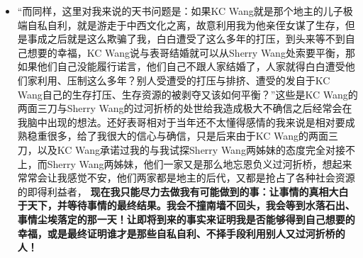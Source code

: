 \documentclass[9pt, b5paper]{article}
\begin{document}
\begin{itemize}
\begin{itemize}
\begin{itemize}
\item “而同样，这里对我来说的天书问题是：如果KC Wang就是那个地主的儿子极端自私自利，就是游走于中西文化之离，故意利用我为他亲侄女谋了生存，但是事成之后就是这么欺骗了我，白白遭受了这么多年的打压，到头来等不到自己想要的幸福，KC Wang说与表哥结婚就可以从Sherry Wang处索要平衡，那如果他们自己没能履行诺言，他们自己不跟人家结婚了，人家就得白白遭受他们家利用、压制这么多年？别人受遭受的打压与排挤、遭受的发自于KC Wang自己的生存打压、生存资源的被剥夺又该如何平衡？”这些是KC Wang的两面三刀与Sherry Wang的过河折桥的处世给我造成极大不确信之后经常会在我脑中出现的想法。还好表哥相对于当年还不太懂得感情的我来说是相对要成熟稳重很多，给了我很大的信心与确信，只是后来由于KC Wang的两面三刀，以及KC Wang承诺过我的与我试探Sherry Wang两姊妹的态度完全对接不上，而Sherry Wang两姊妹，他们一家又是那么地忘恩负义过河折桥，想起来常常会让我感觉不安，他们两家都是地主的后代，又都是抢占了各种社会资源的即得利益者， \textbf{现在我只能尽力去做我有可能做到的事：让事情的真相大白于天下，并等待事情的最终结果。我会不撞南墙不回头，我会等到水落石出、事情尘埃落定的那一天！让即将到来的事实来证明我是否能够得到自己想要的幸福，或是最终证明谁才是那些自私自利、不择手段利用别人又过河折桥的人！}
\end{itemize}
\end{itemize}


\end{itemize}
\end{document}
